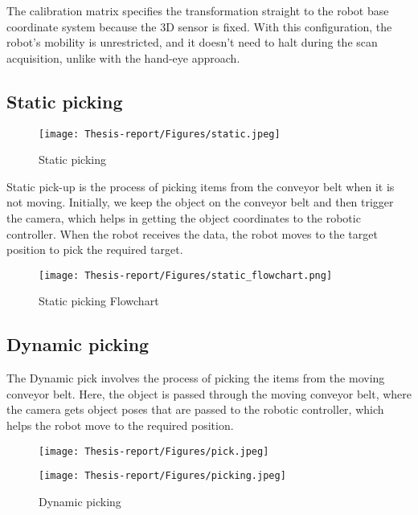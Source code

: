 \documentclass[12pt]{article}
\begin{document}
The calibration matrix specifies the transformation straight to the robot base coordinate system because the 3D sensor is fixed. With this configuration, the robot's mobility is unrestricted, and it doesn't need to halt during the scan acquisition, unlike with the hand-eye approach\cite{ref2}.
\subsection{Static picking}
\begin{figure}[h]
    \centering
    \texttt{[image: Thesis-report/Figures/static.jpeg]}
    \caption{Static picking}
    \label{fig:Photoneo Cmaera}
\end{figure}

Static pick-up is the process of picking items from the conveyor belt when it is not moving. Initially, we keep the object on the conveyor belt and then trigger the camera, which helps in getting the object coordinates to the robotic controller. When the robot receives the data, the robot moves to the target position to pick the required target.

\begin{figure}[h]
    \centering
    \texttt{[image: Thesis-report/Figures/static\_flowchart.png]}
    \caption{Static picking Flowchart}
    \label{fig:Photoneo Cmaera}
\end{figure}


\subsection{Dynamic picking}
The Dynamic pick involves the process of picking the items from the moving conveyor belt. Here, the object is passed through the moving conveyor belt, where the camera gets object poses that are passed to the robotic controller, which helps the robot move to the required position.\\
\begin{figure}[h]
  \centering
  \begin{minipage}{0.45\textwidth}
    \centering
    \texttt{[image: Thesis-report/Figures/pick.jpeg]}

  \end{minipage}%
  \hspace{5mm}%
  \begin{minipage}{0.45\textwidth}
    \centering
    \texttt{[image: Thesis-report/Figures/picking.jpeg]}

  \end{minipage}
  \caption{Dynamic picking}
  \label{fig:gripper-combined}
\end{figure}
\end{document}
